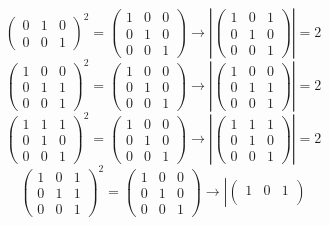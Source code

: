 \documentclass[12pt]{article}
\begin{document}
\begin{itemize}
\begin{itemize}
$$\begin{pmatrix}
0 & 1 & 0 \\
0 & 0 & 1
\end{pmatrix}^2 = \begin{pmatrix}
1 & 0 & 0 \\
0 & 1 & 0 \\
0 & 0 & 1
\end{pmatrix} \rightarrow \left| \begin{pmatrix}
1 & 0 & 1 \\
0 & 1 & 0 \\
0 & 0 & 1
\end{pmatrix} \right| = 2$$
$$\begin{pmatrix}
1 & 0 & 0 \\
0 & 1 & 1 \\
0 & 0 & 1
\end{pmatrix}^2 = \begin{pmatrix}
1 & 0 & 0 \\
0 & 1 & 0 \\
0 & 0 & 1
\end{pmatrix} \rightarrow \left| \begin{pmatrix}
1 & 0 & 0 \\
0 & 1 & 1 \\
0 & 0 & 1
\end{pmatrix} \right| = 2$$
$$\begin{pmatrix}
1 & 1 & 1 \\
0 & 1 & 0 \\
0 & 0 & 1
\end{pmatrix}^2 = \begin{pmatrix}
1 & 0 & 0 \\
0 & 1 & 0 \\
0 & 0 & 1
\end{pmatrix} \rightarrow \left| \begin{pmatrix}
1 & 1 & 1 \\
0 & 1 & 0 \\
0 & 0 & 1
\end{pmatrix} \right| = 2$$
$$\begin{pmatrix}
1 & 0 & 1 \\
0 & 1 & 1 \\
0 & 0 & 1
\end{pmatrix}^2 = \begin{pmatrix}
1 & 0 & 0 \\
0 & 1 & 0 \\
0 & 0 & 1
\end{pmatrix} \rightarrow \left| \begin{pmatrix}
1 & 0 & 1 \\

\end{pmatrix}$$
\end{itemize}
\end{itemize}
\end{document}
